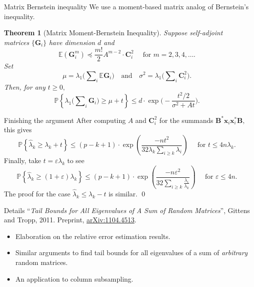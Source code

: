 \documentclass[xcolor={svgnames,pdftex,dvipsnames,table},10pt]{beamer} %
\newcommand{\mat}[1]{\ensuremath{\mathbf{#1}}}
\newcommand{\Prob}[1]{\ensuremath{\mathbb{P}\left\{#1 \right\}}}
\renewcommand{\star}{*}
\newcommand{\E}{\ensuremath{\mathbb{E}}}
\newtheorem*{thm}{Theorem}
\begin{document}
%

\begin{frame}{Matrix Bernstein inequality }
 We use a moment-based matrix analog of Bernstein's inequality.

\begin{thm}[Matrix Moment-Bernstein Inequality]
Suppose self-adjoint matrices $\{\mat{G}_i\}$ have dimension $d$ and 
\[ \E(\mat{G}_i^m) \preceq \frac{m!}{2} A^{m-2} \cdot \mat{C}_i^2 \quad \text{ for } m =2,3,4,\ldots.
\]
Set
\[ \mu = \lambda_1\Big( \sum\nolimits_i \E\mat{G}_i \Big) \quad \text{and} \quad \sigma^2 = \lambda_1\Big(\sum\nolimits_i \mat{C}_i^2 \Big). \]
Then, for any $t \geq 0,$
\[	
 \Prob{ \lambda_1\Big(\sum\nolimits_i \mat{G}_i\Big) \geq \mu + t } \leq d \cdot \exp\Big(- \frac{t^2/2}{\sigma^2 + At} \Big).
\]
\end{thm}

\end{frame}

\begin{frame}{Finishing the argument}
 After computing $A$ and $\mat{C}_i^2$ for the summands $\mat{B}^\star \mat{x}_i \mat{x}_i^\star \mat{B},$ this gives
\[
 \Prob{\hat{\lambda}_k \geq \lambda_k +t} \leq (p-k+1)\cdot \exp\left( \frac{-nt^2}{32\lambda_k \sum_{i \geq k} \lambda_i } \right) \quad \text{ for } t \leq 4n \lambda_k.
\]
Finally, take $t = \varepsilon \lambda_k$ to see
\[
 \Prob{\hat{\lambda}_k \geq (1+\varepsilon) \lambda_k} \leq (p-k+1)\cdot \exp\left( \frac{-n\varepsilon^2}{32\sum_{i \geq k} \frac{\lambda_i}{\lambda_k} } \right) \quad \text{ for } \varepsilon \leq 4n.
\]
The proof for the case $\hat{\lambda}_k \leq \lambda_k - t$ is similar.
\qed
\end{frame}

\begin{frame}{Details}
``{\it Tail Bounds for All Eigenvalues of A Sum of Random Matrices}'', Gittens and Tropp, 2011. Preprint, \href{http://arxiv.org/abs/1104.4513}{arXiv:1104.4513}.
\begin{itemize}
\item Elaboration on the relative error estimation results.
\item Similar arguments to find tail bounds for all eigenvalues of a sum of \emph{arbitrary} random matrices.
\item An application to column subsampling.
\end{itemize}

\end{frame}
\end{document}
